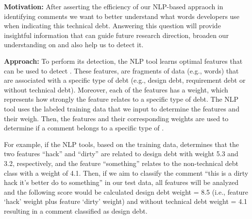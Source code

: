 
\vspace{3mm}
\noindent\rqii
\vspace{3mm}

\noindent \textbf{Motivation:} After asserting the efficiency of our NLP-based appraoch in identifying \SATD comments we want to better understand what words developers use when indicating this technical debt. Answering this question will provide insightful information that can guide future research direction, broaden our understanding on \SATD and also help us to detect it.     

\vspace{1mm}
\noindent \textbf{Approach:} To perform its detection, the NLP tool learns optimal features that can be used to detect \SATD. These features, are fragments of data (e.g., words) that are associated with a specific type of debt (e.g., design debt, requirement debt or without technical debt). Moreover, each of the features has a weight, which represents how strongly the feature relates to a specific type of debt. The NLP tool uses the labeled training data that we input to determine the features and their weigh. Then, the features and their corresponding weights are used to determine if a comment belongs to a specific type of \SATD.

For example, if the NLP tools, based on the training data, determines that the two features ``hack'' and ``dirty'' are related to design debt with weight 5.3 and 3.2, respectively, and the feature ``something'' relates to the non-technical debt class with a weight of 4.1. Then, if we aim to classify the comment ``this is a dirty hack it's better do to something'' in our test data, all features will be analyzed and the following score would be calculated design debt weight = 8.5 (i.e., feature `hack' weight plus feature `dirty' weight) and without technical debt weight = 4.1 resulting in a comment classified as design debt.


